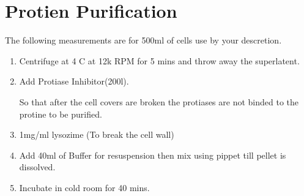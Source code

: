 \documentclass[11pt,twoside,a4paper]{article}
\begin{document}
\section{Protien Purification}
The following measurements are for 500ml of cells use by your descretion.
\begin{enumerate}
	\item Centrifuge at 4 \textdegree C at 12k RPM for 5 mins and throw away the superlatent.
	\item Add Protiase Inhibitor(200\textmu{}l).

		So that after the cell covers are broken the protiases are not binded to the protine to be purified.
	\item 1mg/ml lysozime (To break the cell wall)
	\item Add 40ml of Buffer for resuspension then mix using pippet till pellet is dissolved.
	\item Incubate in cold room for 40 mins.
\end{enumerate}
\end{document}
